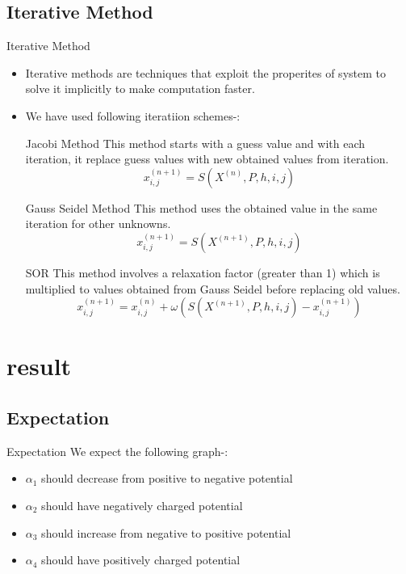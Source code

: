 \documentclass[9 pt]{beamer}
\begin{document}
		\subsection{Iterative Method }
		\begin{frame}{Iterative Method}
			\begin{itemize}
				\item Iterative methods are techniques that exploit the properites of system to solve it implicitly to make computation faster.
				\item We have used following iteratiion schemes-:\\
			
					 \begin{block}{Jacobi Method}
						This method starts with a guess value and with each iteration, it replace guess values with new obtained values from iteration.$$ x^{(n+1)}_{i,j} = S(X^{(n)},P,h,i,j) $$
						\end{block}
					 \begin{block}{Gauss Seidel Method}
						This method uses the obtained value in the same iteration for other unknowns.$$x^{(n+1)}_{i,j} = S(X^{(n+1)},P,h,i,j)$$
						\end{block}
					
					\begin{block}{SOR}
							This method involves a relaxation factor (greater than 1) which is multiplied to values obtained from Gauss Seidel before replacing old values.$$x^{(n+1)}_{i,j} = x^{(n)}_{i,j}+ \omega(S(X^{(n+1)},P,h,i,j)- x^{(n+1)}_{i,j})$$
							
						\end{block}
				
					
					\end{itemize}
				\end{frame}
			\section{result}
				\subsection{Expectation}
				\begin{frame}{Expectation}
					We expect the following graph-:\\
					\begin{itemize}
						\item $ \alpha_1 $ should decrease from positive to negative potential
						\item $ \alpha_2 $ should have negatively charged potential
						\item $ \alpha_3 $ should increase from negative to positive potential
						\item $ \alpha_4 $ should have positively charged  potential
					\end{itemize}
					
				\end{frame}
\end{document}
